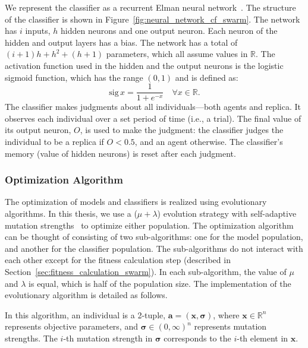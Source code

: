 We represent the classifier as a recurrent Elman neural network~\cite{Elman1990}. The structure of the classifier is shown in Figure~\ref{fig:neural_network_cf_swarm}. The network has $i$ inputs, $h$ hidden neurons and one output neuron. Each neuron of the hidden and output layers has a bias. The network has a total of $(i+1) h + h^2 + (h+1)$ parameters, which all assume values in $\mathbb{R}$. The activation function used in the hidden and the output neurons is the logistic sigmoid function, which has the range $\left(0,1\right)$ and is defined as: 
%
\begin{equation}\label{equ:logistic_sigmoid}
\textrm{sig}\,x = \frac{1}{1+e^{-x}}\quad\forall x \in \mathbb{R}.
\end{equation}
%
The classifier makes judgments about all individuals---both agents and replica. It observes each individual over a set period of time (i.e., a trial). The final value of its output neuron, $O$, is used to make the judgment: the classifier judges the individual to be a replica if $O<0.5$, and an agent otherwise. The classifier's memory (value of hidden neurons) is reset after each judgment.

\subsubsection{Optimization Algorithm}\label{sec:optimization_algorithm_swarm}

The optimization of models and classifiers is realized using evolutionary algorithms. In this thesis, we use a ($\mu+\lambda$) evolution strategy with self-adaptive mutation strengths~\cite{Beyer2001, Beyer2002, Eiben2003} to optimize either population. The optimization algorithm can be thought of consisting of two sub-algorithms: one for the model population, and another for the classifier population. The sub-algorithms do not interact with each other except for the fitness calculation step (described in Section~\ref{sec:fitness_calculation_swarm}). In each sub-algorithm, the value of $\mu$ and $\lambda$ is equal, which is half of the population size. The implementation of the evolutionary algorithm is detailed as follows.

In this algorithm, an individual is a 2-tuple,
$\mathbf{a}=\left(\mathbf{x},\boldsymbol{\sigma}\right)$, where $\mathbf{x\in\mathbb{R}}^n$ represents objective parameters, and $\boldsymbol{\sigma}\in \left(0,\infty\right)^n$
represents mutation strengths. The $i$-th mutation strength in $\boldsymbol{\sigma}$ corresponds to the $i$-th element in $\mathbf{x}$. 

